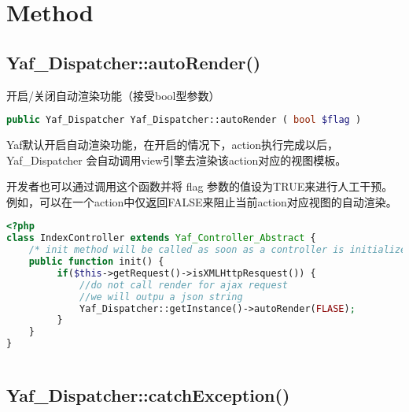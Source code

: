 \begin{lstlisting}[language=PHP]

\end{lstlisting}



\begin{lstlisting}[language=PHP]

\end{lstlisting}

\section{Method}


\subsection{Yaf\_Dispatcher::autoRender()}

开启/关闭自动渲染功能（接受bool型参数）

\begin{lstlisting}[language=PHP]
public Yaf_Dispatcher Yaf_Dispatcher::autoRender ( bool $flag )
\end{lstlisting}

Yaf默认开启自动渲染功能，在开启的情况下，action执行完成以后，Yaf\_Dispatcher 会自动调用view引擎去渲染该action对应的视图模板。 

开发者也可以通过调用这个函数并将 flag 参数的值设为TRUE来进行人工干预。例如，可以在一个action中仅返回FALSE来阻止当前action对应视图的自动渲染。


\begin{lstlisting}[language=PHP]
<?php
class IndexController extends Yaf_Controller_Abstract {
    /* init method will be called as soon as a controller is initialized */ 
    public function init() {
         if($this->getRequest()->isXMLHttpResquest()) {
             //do not call render for ajax request
             //we will outpu a json string
             Yaf_Dispatcher::getInstance()->autoRender(FLASE);
         }
    }
}
\end{lstlisting}



\begin{lstlisting}[language=PHP]

\end{lstlisting}

\subsection{Yaf\_Dispatcher::catchException()}

